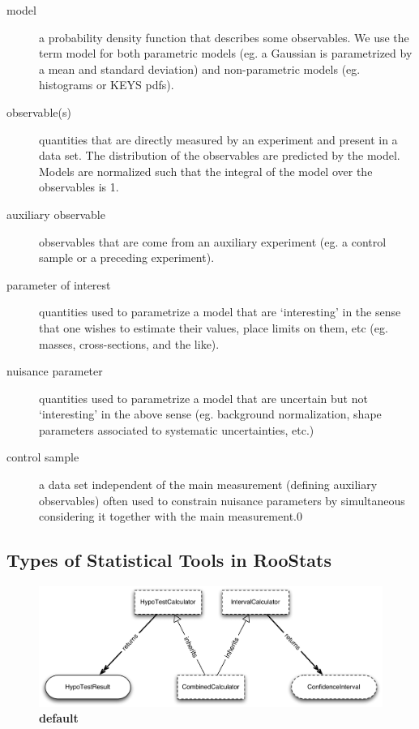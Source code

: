 \documentclass[11pt]{article}
\begin{document}
\begin{description}
\item[ model ] a probability density function that describes some observables.  We use the term model for both parametric models (eg. a Gaussian is parametrized by a mean and standard deviation) and non-parametric models (eg. histograms or KEYS pdfs).

\item[ observable(s)] quantities that are directly measured by an experiment and present in a data set.  The distribution of the observables are predicted by the model.  Models are normalized such that the integral of the model over the observables is 1.

\item[ auxiliary observable] observables that are come from an auxiliary experiment (eg. a control sample or a preceding experiment).

\item[ parameter of interest] quantities used to parametrize a model that are `interesting' in the sense that one wishes to estimate their values,  place limits on them, etc (eg. masses, cross-sections, and the like).

\item[ nuisance parameter ] quantities used to parametrize a model that are uncertain but not `interesting' in the above sense (eg. background normalization, shape parameters associated to systematic uncertainties, etc.)

\item[ control sample ] a data set independent of the main measurement (defining auxiliary observables) often used to constrain nuisance parameters by simultaneous considering it together with the main measurement.0

\end{description}

\subsection{Types of Statistical Tools in RooStats}

\begin{figure}[htbp]
\begin{center}
\includegraphics[width=\textwidth]{RooStats_OverviewOfInterfaces.pdf}
\caption{{\bf default}}
\label{default}
\end{center}
\end{figure}
\end{document}
